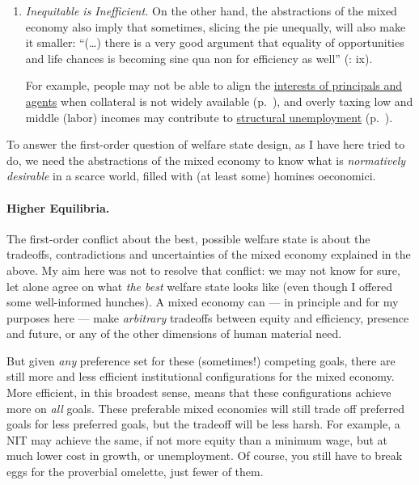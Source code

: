 \begin{enumerate}
\begin{enumerate}
		\item \emph{Inequitable is Inefficient.} On the other hand, the abstractions of the mixed economy also imply that sometimes, slicing the pie unequally, will also make it smaller: ``(\ldots) there is a very good argument that equality of opportunities and life chances is becoming sine qua non for efficiency as well'' (\citealt{Esping-Andersen2002}: ix).

		For example, people may not be able to align the \hyperref[sec:principal-agent-problem]{interests of principals and agents} when collateral is not widely available (p.~\pageref{sec:principal-agent-problem}), and overly taxing low and middle (labor) incomes may contribute to \hyperref[sec:minimalDWL]{structural unemployment} (p.~\pageref{sec:minimalDWL}).
	\end{enumerate}

	To answer the first-order question of welfare state design, as I have here tried to do, we need the abstractions of the mixed economy to know what is \emph{normatively desirable} in a scarce world, filled with (at least some) homines oeconomici.
\end{enumerate}

\paragraph[Higher Equilibria]{Higher Equilibria.} The first-order conflict about the best, possible welfare state is about the tradeoffs, contradictions and uncertainties of the mixed economy explained in the above. My aim here was not to resolve that conflict: we may not know for sure, let alone agree on what \emph{the best} welfare state looks like (even though I offered some well-informed hunches). A mixed economy can --- in principle and for my purposes here --- make \emph{arbitrary} tradeoffs between equity and efficiency, presence and future, or any of the other dimensions of human material need.

But given \emph{any} preference set for these (sometimes!) competing goals, there are still more and less efficient institutional configurations for the mixed economy. More efficient, in this broadest sense, means that these configurations achieve more on \emph{all} goals. These preferable mixed economies will still trade off preferred goals for less preferred goals, but the tradeoff will be less harsh. For example, a \gls{NIT} may achieve the same, if not more equity than a minimum wage, but at much lower cost in growth, or unemployment. Of course, you still have to break eggs for the proverbial omelette, just fewer of them.

